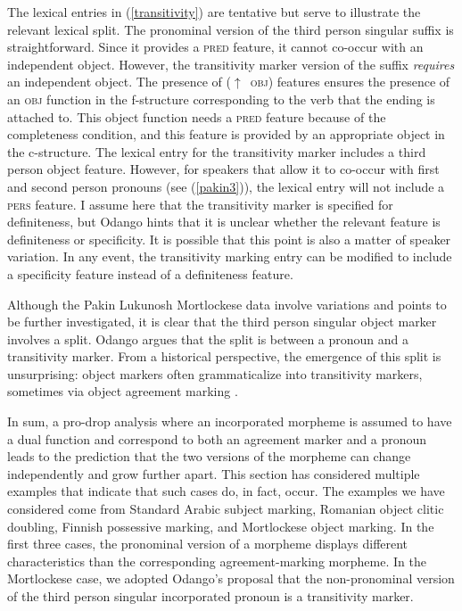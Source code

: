 \documentclass[output=paper,hidelinks]{langscibook}
\begin{document}
The lexical entries in (\ref{transitivity}) are tentative but serve to illustrate the relevant  lexical split.  The pronominal version of the third person singular suffix is straightforward.  Since it provides a \textsc{pred} feature, it cannot co-occur with an independent object.  However, the transitivity marker version of the suffix \textit{requires} an independent object.  The  presence of  ($\uparrow$~\textsc{obj}) features ensures the presence of an \textsc{obj} function  in the  f-structure corresponding to the verb that the ending is attached to. This object function needs a \textsc{pred} feature because of  the completeness condition, and this feature is provided by   an appropriate object in the c-structure.    The   lexical entry for the transitivity marker  includes a third person object feature. However, for  speakers that allow it to co-occur with first and second person pronouns (see (\ref{pakin3})),  the lexical entry will not include a \textsc{pers} feature.    I assume here that the transitivity marker is specified for  definiteness, but  Odango hints that it is unclear whether the relevant feature is definiteness or specificity.  It is possible that this point is also a matter of speaker variation. In any event, the transitivity marking entry can be modified to include a specificity feature instead of a definiteness feature. 

Although the  Pakin Lukunosh Mortlockese data involve variations and  points to be further investigated, it is clear that the third person singular object marker involves a split.  Odango argues that the split is between a pronoun and a transitivity marker.   From a historical perspective, the emergence of this split is unsurprising:  object markers often grammaticalize into transitivity markers, sometimes via object agreement marking \citep{lehmann02, mayer17, widmer18}. 

 

In sum,  a pro-drop analysis where an incorporated morpheme is assumed to have a dual function  and correspond to both an agreement marker and a pronoun  leads to the  prediction that the two versions of the morpheme can    change independently  and grow further apart.  This section has considered multiple examples that indicate that such cases do, in fact, occur.  The examples we have considered come from Standard Arabic subject marking,  Romanian object clitic doubling, Finnish possessive marking, and Mortlockese object marking. In the first three cases, the pronominal version of a morpheme displays  different characteristics than the corresponding agreement-marking morpheme. In the Mortlockese case,   we adopted Odango's proposal that the non-pronominal version of the third person singular incorporated pronoun is a transitivity marker. 
   
\end{document}
